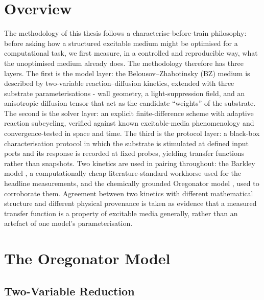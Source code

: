
\section{Overview}
\label{sec:meth_overview}

The methodology of this thesis follows a characterise-before-train philosophy: before asking how a structured excitable medium might be optimised for a computational task, we first measure, in a controlled and reproducible way, what the unoptimised medium already does. 
The methodology therefore has three layers.
The first is the model layer: the Belousov--Zhabotinsky (BZ) medium is described by two-variable reaction--diffusion kinetics, extended with three substrate parameterisations - wall geometry, a light-suppression field, and an anisotropic diffusion tensor that act as the candidate ``weights'' of the substrate. 
The second is the solver layer: an explicit finite-difference scheme with adaptive reaction subcycling, verified against known excitable-media phenomenology and convergence-tested in space and time. 
The third is the protocol layer: a black-box characterisation protocol in which the substrate is stimulated at defined input ports and its response is recorded at fixed probes, yielding transfer functions rather than snapshots. 
Two kinetics are used in pairing throughout: the Barkley model \cite{barkley1991model}, a computationally cheap literature-standard workhorse used for the headline measurements, and the chemically grounded Oregonator model \cite{field1974oregonator, tyson1980target}, used to corroborate them. 
Agreement between two kinetics with different mathematical structure and different physical provenance is taken as evidence that a measured transfer function is a property of excitable media generally, rather than an artefact of one model's parameterisation.

\section{The Oregonator Model}
\label{sec:meth_oregonator}

\subsection{Two-Variable Reduction}
\label{sec:meth_oregonator_2var}

